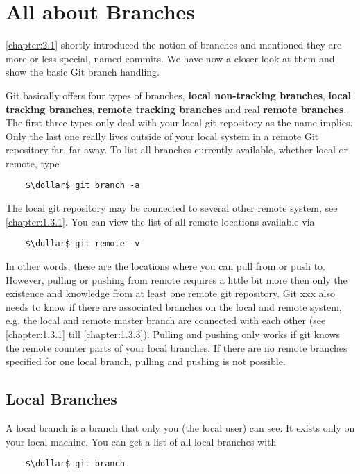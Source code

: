 \chapter{All about Branches}
\label{chapter:3}

\cref{chapter:2.1} shortly introduced the notion of branches and mentioned they are more or less special, named commits.
We have now a closer look at them and show the basic Git branch handling.

Git basically offers four types of branches, \textbf{local non-tracking branches}, \textbf{local tracking branches}, \textbf{remote tracking 
branches} and real \textbf{remote branches}.
The first three types only deal with your local git repository as the name implies. Only the last one really lives 
outside of your local system in a remote Git repository far, far away.
To list all branches currently available, whether local or remote, type 

\begin{lstlisting}
	$\dollar$ git branch -a 
\end{lstlisting}

The local git repository may be connected to several other remote system, see \cref{chapter:1.3.1}. You can view the list of 
all remote locations available via
\begin{lstlisting}
	$\dollar$ git remote -v 
\end{lstlisting}
 
In other words, these are the locations where you can pull from or push to. However, pulling or pushing from remote 
requires a little bit more then only the existence and knowledge from at least one remote git repository. Git xxx also needs 
to know if there are associated branches on the local and remote system, e.g. the local and remote master branch are connected 
with each other (see \cref{chapter:1.3.1} till \cref{chapter:1.3.3}). Pulling and pushing only works if git knows the remote 
counter parts of your local branches. If there are no remote branches specified for one local branch, pulling and pushing is not possible.



\section{Local Branches}
\label{chapter:3.1}


A local branch is a branch that only you (the local user) can see. It exists only on your local machine.
You can get a list of all local branches with
\begin{lstlisting}
	$\dollar$ git branch 
\end{lstlisting}



